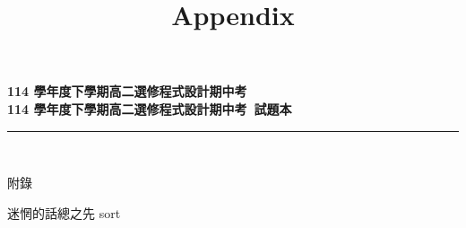 \documentclass[a4paper]{article}
\title{Appendix}
\begin{document}
\begin{center}
\textbf{\huge 114 學年度下學期高二選修程式設計期中考}\\
\vspace{5mm}
\textbf{\huge 114 學年度下學期高二選修程式設計期中考\ 試題本}\\
\vspace{10mm}
\rule{17cm}{2pt}\\
\vspace{5mm}

\huge 附錄\\
\end{center}

\fontsize{14pt}{20pt}\selectfont

\noindent 迷惘的話總之先 sort
\end{document}
